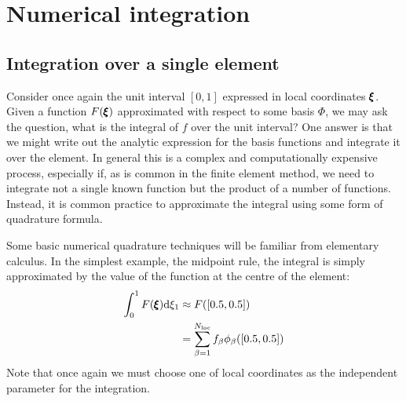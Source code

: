 \documentclass[a4paper, 11pt]{book}
\begin{document}
\section{Numerical integration}\label{sec:1dquadrature}

\subsection{Integration over a single element}

Consider once again the unit interval $[0,1]$ expressed in local coordinates
$\pmb{\xi}$. Given a function $F(\pmb{\xi})$ approximated with respect to some basis
$\Phi$, we may ask the question, what is the integral of $f$ over the unit
interval? One answer is that we might write out the analytic expression for
the basis functions and integrate it over the element. In general this is a
complex and computationally expensive process, especially if, as is common
in the finite element method, we need to integrate not a single known
function but the product of a number of functions. Instead, it is common
practice to approximate the integral using some form of quadrature formula.

Some basic numerical quadrature techniques will be familiar from elementary
calculus. In the simplest example, the midpoint rule, the integral is simply
approximated by the value of the function at the centre of the element:
\begin{equation}
  \begin{split}
    \int_{0}^1 F(\pmb{\xi})\mathrm{d}\xi_1&\approx F([0.5,0.5])\\
    &=\sum_{\beta=1}^{N_\mathrm{loc}} f_{\beta}\phi_{\beta}([0.5,0.5])
  \end{split}
\end{equation}
Note that once again we must choose one of local coordinates as the
independent parameter for the integration.
\end{document}
